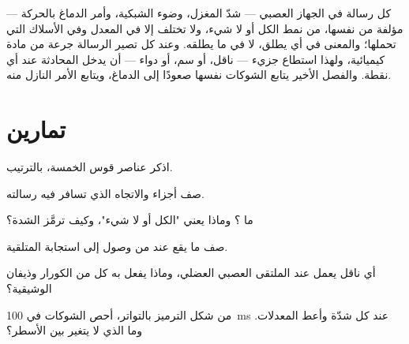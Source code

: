 \begin{remark}\label{rem:g12:stretch-reflex:spikes}
كل رسالة في الجهاز العصبي --- شدّ المغزل، وضوء الشبكية، وأمر الدماغ
بالحركة --- مؤلفة من  نفسها، من نمط الكل أو لا شيء، ولا
تختلف إلا في المعدل وفي الأسلاك التي تحملها؛ والمعنى في أي  يطلق،
لا في ما يطلقه. وعند كل  تصير الرسالة جرعة من مادة كيميائية، ولهذا
استطاع جزيء --- ناقل، أو سم، أو دواء --- أن يدخل المحادثة عند أي نقطة.
والفصل الأخير يتابع الشوكات  نفسها صعودًا إلى الدماغ، ويتابع
الأمر النازل منه.
\end{remark}

\section{تمارين}

\begin{exercise}[$\star$]\label{exo:g12:stretch-reflex:1}
اذكر عناصر قوس  الخمسة، بالترتيب.
\end{exercise}

\begin{exercise}[$\star$]\label{exo:g12:stretch-reflex:2}
صف أجزاء  والاتجاه الذي تسافر فيه رسالته.
\end{exercise}

\begin{exercise}[$\star$]\label{exo:g12:stretch-reflex:3}
ما ؟ وماذا يعني "الكل أو لا شيء"، وكيف ترمَّز الشدة؟
\end{exercise}

\begin{exercise}[$\star$]\label{exo:g12:stretch-reflex:4}
صف ما يقع عند  من وصول  إلى استجابة  المتلقية.
\end{exercise}

\begin{exercise}[$\star$]\label{exo:g12:stretch-reflex:5}
أي ناقل يعمل عند الملتقى العصبي العضلي، وماذا يفعل به كل من الكورار
وذيفان الوشيقية؟
\end{exercise}

\begin{exercise}[$\star\star$]\label{exo:g12:stretch-reflex:6}
من شكل الترميز بالتواتر، أحص الشوكات في \qty{100}{ms} عند كل شدّة وأعط
المعدلات. وما الذي لا يتغير بين الأسطر؟
\end{exercise}

